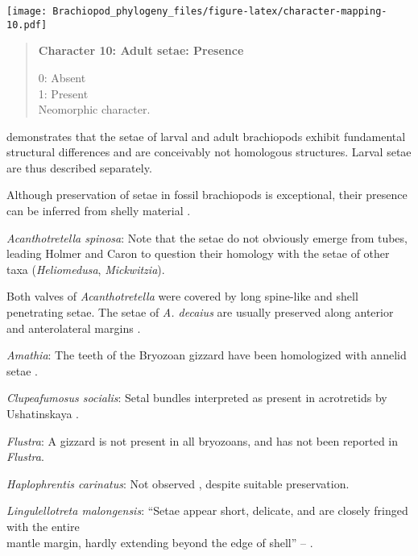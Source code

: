 \documentclass[openany]{book}
\theoremstyle{definition}
\theoremstyle{definition}
\theoremstyle{definition}
\theoremstyle{remark}
\begin{document}
\texttt{[image: Brachiopod\_phylogeny\_files/figure-latex/character-mapping-10.pdf]}

\begin{quote}
\textbf{Character 10: Adult setae: Presence}

0: Absent\\
1: Present\\
Neomorphic character.
\end{quote}

\citet{Luter2000} demonstrates that the setae of larval and adult
brachiopods exhibit fundamental structural differences and are
conceivably not homologous structures. Larval setae are thus described
separately.

Although preservation of setae in fossil brachiopods is exceptional,
their presence can be inferred from shelly material
\citep[see][]{Holmer2006Aspinose}.

\hypertarget{Acanthotretella_spinosa-coding-10}{}
\emph{Acanthotretella spinosa}: Note that the setae do not obviously
emerge from tubes, leading Holmer and Caron to question their homology
with the setae of other taxa (\emph{Heliomedusa}, \emph{Mickwitzia}).

Both valves of \emph{Acanthotretella} were covered by long spine-like
and shell penetrating setae. The setae of \emph{A. decaius} are usually
preserved along anterior and anterolateral margins
\citep{Hu2010Softpart}.

\hypertarget{Amathia-coding-10}{}
\emph{Amathia}: The teeth of the Bryozoan gizzard have been homologized
with annelid setae \citep{Gordon1975}.

\hypertarget{Clupeafumosus_socialis-coding-10}{}
\emph{Clupeafumosus socialis}: Setal bundles interpreted as present in
acrotretids by Ushatinskaya \citeyearpar{Ushatinskaya2016Protegulumand}.

\hypertarget{Flustra-coding-10}{}
\emph{Flustra}: A gizzard is not present in all bryozoans, and has not
been reported in \emph{Flustra}.

\hypertarget{Haplophrentis_carinatus-coding-10}{}
\emph{Haplophrentis carinatus}: Not observed
\citep{Moysuik2017Hyolithsare}, despite suitable preservation.

\hypertarget{Lingulellotreta_malongensis-coding-10}{}
\emph{Lingulellotreta malongensis}: ``Setae appear short, delicate, and
are closely fringed with the entire\\
mantle margin, hardly extending beyond the edge of shell'' --
\citet{Zhang2005}.
\end{document}

